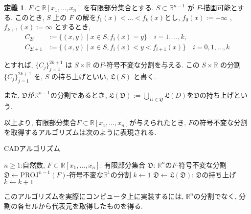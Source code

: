 \documentclass[dvipdfmx]{jsarticle}
\newcommand{\R}{\mathbb{R}}
\newcommand{\PROJ}{\mathrm{PROJ}}
\theoremstyle{definition}
\newtheorem{definition}{定義}[section]
\begin{document}
\begin{definition}
$ F \subset \mathbb{R}[x_1,\dots,x_n] $ を有限部分集合とする. $ S \subset \mathbb{R}^{n-1} $ が $ F $-描画可能とする.
このとき, $ S $ 上の $ F $ の解を$ f_1(x)< \dots <f_k(x) $とし, $ f_0(x) := -\infty $ , $ f_{k+1}(x) := \infty $ とするとき,
\begin{align*}
  C_{2i} &:= \{(x,y) \mid  x \in S, f_i(x) = y \} \quad i = 1,\dots, k,\\
  C_{2i+1} &:= \{(x,y) \mid x \in S, f_{i}(x)<y<f_{i+1}(x) \} \quad i = 0,1, \dots, k 
\end{align*}

とすれば, $\{C_j\}_{j=1}^{2k+1}$ は $ S \times \mathbb{R} $ の$F$-符号不変な分割を与える.
この $ S \times \mathbb{R} $ の分割 $ \{C_j\}_{j=1}^{2k+1} $ を, $ S $ の持ち上げといい, $ \mathfrak{L}(S) $ と書く.

また, $\mathfrak{D}$が$\R^{n-1}$の分割であるとき, $\mathfrak{L}(\mathfrak{D}) := \bigcup_{D \in \mathfrak{D}}\mathfrak{L}(D)$を$\mathfrak{D}$の持ち上げという.
\end{definition}

以上より, 有限部分集合$F \subset \R[x_1, \dots, x_n]$が与えられたとき, $F$の符号不変な分割を取得するアルゴリズムは次のように表現される.

\begin{algorithm}
    \caption{CADアルゴリズム}
    \begin{algorithmic}[1]
    \REQUIRE $n \geq 1$:自然数, $F \subset \R[x_1, \dots, x_n]$: 有限部分集合
    \ENSURE $\mathfrak{D}$: $\R^n$の$F$-符号不変な分割
    \STATE $\mathfrak{D} \leftarrow \text{$\PROJ^{n-1}(F)$-符号不変な$\R^1$の分割}$
    \STATE $k \leftarrow 1$
    \STATE $\mathfrak{D} \leftarrow \text{$\mathfrak{L}(\mathfrak{D})$: $\mathfrak{D}$の持ち上げ}$
    \STATE $k \leftarrow k+1$
    \ENDWHILE
    \end{algorithmic}
\end{algorithm}

このアルゴリズムを実際にコンピュータ上に実装するには, $\R^n$の分割でなく, 分割の各セルから代表元を取得したものを得る. 
\end{document}
